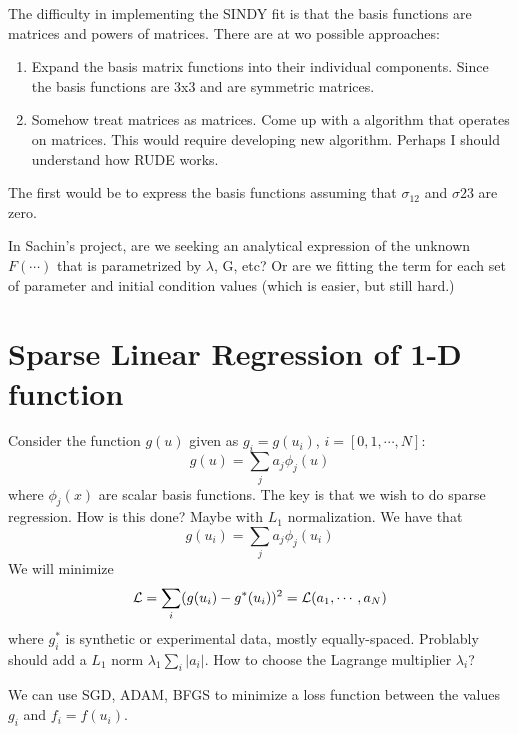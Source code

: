 \documentclass[11pt]{article}
\begin{document}
The difficulty in implementing the SINDY fit is that the basis functions are matrices and powers of matrices. 
There are at wo possible approaches: 

\begin{enumerate}
\item
Expand the basis matrix functions into their individual components. Since the basis functions are 3x3 and are 
symmetric matrices. 
\item
Somehow treat matrices as matrices. Come up with a algorithm that operates on matrices. This would require 
developing  new algorithm. Perhaps I should understand how RUDE works. 
\end{enumerate}

The first would be to express the basis functions assuming that $\sigma_{12}$ and $\sigma{23}$ are zero.

In Sachin's project, are we seeking an analytical expression of the unknown $F(\cdots)$ that is parametrized by 
$\lambda$, G, etc? Or are we fitting the term for each set of parameter and initial condition values 
(which is easier, but still hard.) 

\section{Sparse Linear Regression of 1-D function}
Consider the function $g(u)$ given as $g_i = g(u_i)$, $i=[0,1,\cdots,N]$: 
$$
g(u) = \sum_j a_j \phi_j(u)
$$
where $\phi_j(x)$ are scalar basis functions. The key is that we wish to do sparse regression. How is this done? Maybe 
with $L_1$ normalization. 
We have that 
$$ g(u_i) = \sum_j a_j \phi_j(u_i)$$
We will minimize 
$$
{\cal L} = \sum_i (g(u_i) - g^*(u_i))^2 = {\cal L}(a_1,\cdots,a_N)
$$ 
where $g^*_i$ is synthetic or experimental data, mostly equally-spaced. 
Problably should add a $L_1$ norm $\lambda_1 \sum_i |a_i|$. How to choose the Lagrange multiplier $\lambda_i$? 

We can use SGD, ADAM, BFGS to minimize a loss function between the values $g_i$ and $f_i=f(u_i)$. 
\end{document}
